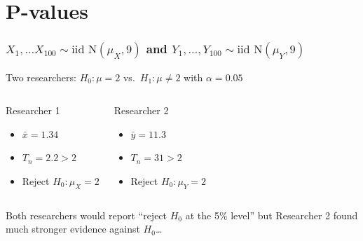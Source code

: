 \section{P-values}
\begin{frame}
  \frametitle{$X_1, \dots X_{100} \sim \mbox{iid N}(\mu_X, 9)$ and $Y_1, \dots, Y_{100}\sim \mbox{iid N}(\mu_Y, 9)$}
  Two researchers: $H_0\colon \mu = 2$ vs.\ $H_1\colon \mu \neq 2$ with $\alpha = 0.05$

\begin{columns}
  \begin{block}{Researcher 1}
    \begin{itemize}
      \item $\bar{x} = 1.34$
      \item $T_n = 2.2 > 2$
      \item Reject $H_0\colon \mu_X = 2$ 
    \end{itemize}
  \end{block}

  \begin{block}{Researcher 2}
    \begin{itemize}
      \item $\bar{y} = 11.3$
      \item $T_n = 31 > 2$
      \item Reject $H_0\colon \mu_Y = 2$
    \end{itemize}
  \end{block}
\end{columns}

\vspace{1em}
\alert{Both researchers would report ``reject $H_0$ at the 5\% level'' but Researcher 2 found much stronger evidence against $H_0$\dots}

\end{frame}
